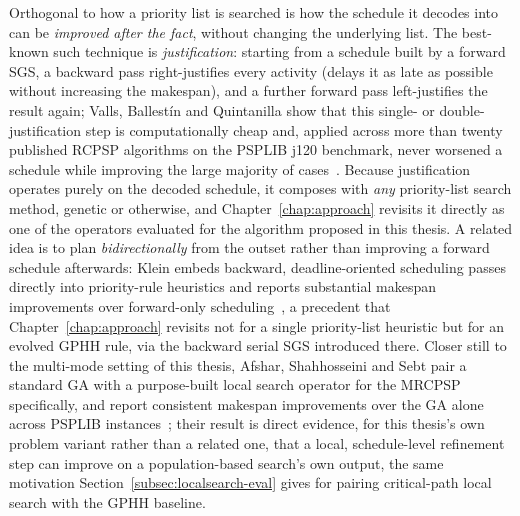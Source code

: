 Orthogonal to how a priority list is searched is how the schedule it decodes
into can be \emph{improved after the fact}, without changing the underlying
list. The best-known such technique is \emph{justification}: starting from a
schedule built by a forward SGS, a backward pass right-justifies every
activity (delays it as late as possible without increasing the makespan), and a
further forward pass left-justifies the result again; Valls, Ballest{\'i}n and
Quintanilla show that this single- or double-justification step is
computationally cheap and, applied across more than twenty published RCPSP
algorithms on the PSPLIB j120 benchmark, never worsened a schedule while
improving the large majority of
cases~\cite{valls2005justification}. 
Because justification operates purely on the
decoded schedule, it composes with \emph{any} priority-list search method,
genetic or otherwise, and Chapter~\ref{chap:approach} revisits it directly as
one of the operators evaluated for the algorithm proposed in this thesis.
A related idea is to plan \emph{bidirectionally} from the outset rather than
improving a forward schedule afterwards: Klein embeds backward,
deadline-oriented scheduling passes directly into priority-rule heuristics and
reports substantial makespan improvements over forward-only
scheduling~\cite{klein2000bidirectional}, a precedent that
Chapter~\ref{chap:approach} revisits not for a single priority-list heuristic
but for an evolved GPHH rule, via the backward serial SGS introduced there.
Closer still to the multi-mode setting of this thesis, Afshar, Shahhosseini
and Sebt pair a standard GA with a purpose-built local search operator for
the MRCPSP specifically, and report consistent makespan improvements over
the GA alone across PSPLIB instances~\cite{afshar2022ga}; their result is
direct evidence, for this thesis's own problem variant rather than a
related one, that a local, schedule-level refinement step can improve on a
population-based search's own output, the same motivation
Section~\ref{subsec:localsearch-eval} gives for pairing critical-path local
search with the GPHH baseline.


